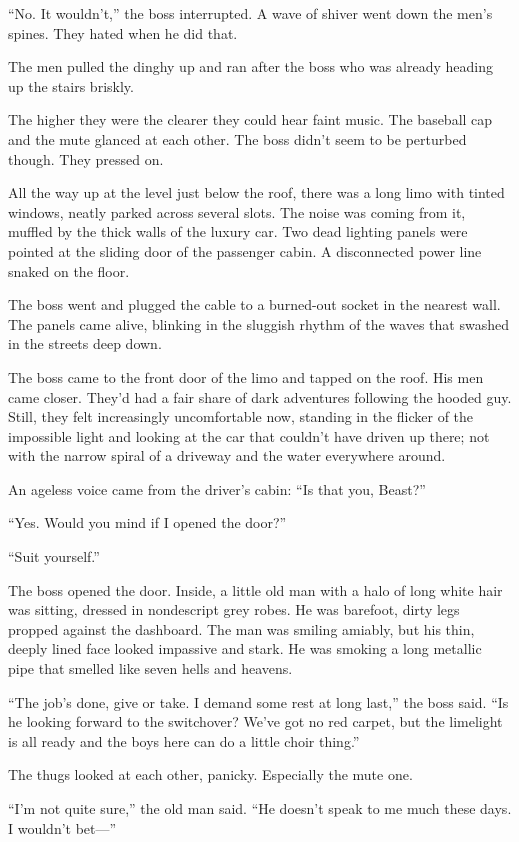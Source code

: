 ``No. It wouldn't,'' the boss interrupted. A wave of shiver went down the men's spines. They hated when he did that.
 
The men pulled the dinghy up and ran after the boss who was already heading up the stairs briskly.
 
The higher they were the clearer they could hear faint music. The baseball cap and the mute glanced at each other. The boss didn't seem to be perturbed though. They pressed on.

All the way up at the level just below the roof, there was a long limo with tinted windows, neatly parked across several slots. The noise was coming from it, muffled by the thick walls of the luxury car. Two dead lighting panels were pointed at the sliding door of the passenger cabin. A disconnected power line snaked on the floor.
 
The boss went and plugged the cable to a burned-out socket in the nearest wall. The panels came alive, blinking in the sluggish rhythm of the waves that swashed in the streets deep down.
 
The boss came to the front door of the limo and tapped on the roof. His men came closer. They'd had a fair share of dark adventures following the hooded guy. Still, they felt increasingly uncomfortable now, standing in the flicker of the impossible light and looking at the car that couldn't have driven up there; not with the narrow spiral of a driveway and the water everywhere around.
 
An ageless voice came from the driver's cabin: ``Is that you, Beast?''
 
``Yes. Would you mind if I opened the door?''
 
``Suit yourself.''
 
The boss opened the door. Inside, a little old man with a halo of long white hair was sitting, dressed in nondescript grey robes. He was barefoot, dirty legs propped against the dashboard. The man was smiling amiably, but his thin, deeply lined face looked impassive and stark. He was smoking a long metallic pipe that smelled like seven hells and heavens.
 
``The job's done, give or take. I demand some rest at long last,'' the boss said. ``Is he looking forward to the switchover? We've got no red carpet, but the limelight is all ready and the boys here can do a little choir thing.''

The thugs looked at each other, panicky. Especially the mute one.
 
``I'm not quite sure,'' the old man said. ``He doesn't speak to me much these days. I wouldn't bet---''
 
